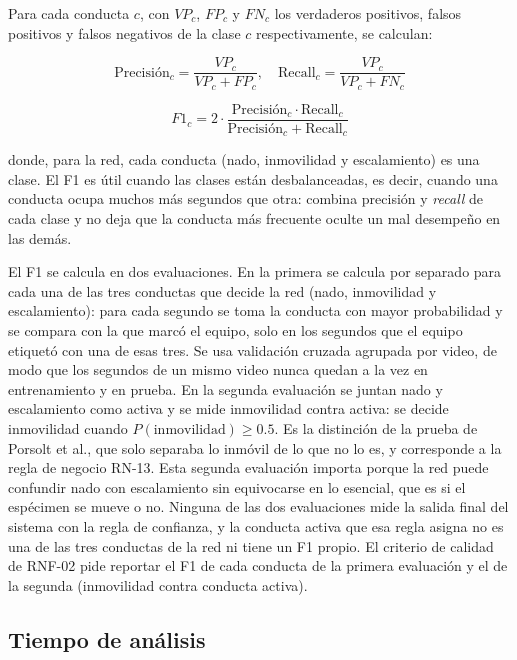 Para cada conducta $c$, con $VP_c$, $FP_c$ y $FN_c$ los verdaderos positivos, falsos
positivos y falsos negativos de la clase $c$ respectivamente, se calculan:

\begin{equation}
    \text{Precisión}_c = \frac{VP_c}{VP_c + FP_c}, \quad
    \text{Recall}_c = \frac{VP_c}{VP_c + FN_c}
    \label{eq:precision_recall}
\end{equation}

\begin{equation}
    F1_c = 2 \cdot \frac{\text{Precisión}_c \cdot \text{Recall}_c}{\text{Precisión}_c + \text{Recall}_c}
    \label{eq:f1}
\end{equation}

donde, para la red, cada conducta (nado, inmovilidad y escalamiento) es una clase. El F1 es útil cuando las clases están
desbalanceadas, es decir, cuando una conducta ocupa muchos más segundos que otra: combina
precisión y \textit{recall} de cada clase y no deja que la conducta más frecuente oculte un
mal desempeño en las demás.

El F1 se calcula en dos evaluaciones. En la primera se calcula por separado para cada una
de las tres conductas que decide la red (nado, inmovilidad y escalamiento): para cada
segundo se toma la conducta con mayor probabilidad y se compara con la que marcó el
equipo, solo en los segundos que el equipo etiquetó con una de esas tres. Se usa validación
cruzada agrupada por video, de modo que los segundos de un mismo video nunca quedan a la
vez en entrenamiento y en prueba. En la segunda evaluación se juntan nado y escalamiento
como activa y se mide inmovilidad contra activa: se decide inmovilidad cuando
$P(\text{inmovilidad}) \geq 0.5$. Es la distinción de la prueba de Porsolt et al., que solo
separaba lo inmóvil de lo que no lo es, y corresponde a la regla de negocio RN-13. Esta
segunda evaluación importa porque la red puede confundir nado con escalamiento sin
equivocarse en lo esencial, que es si el espécimen se mueve o no. Ninguna de las dos
evaluaciones mide la salida final del sistema con la regla de confianza, y la conducta
activa que esa regla asigna no es una de las tres conductas de la red ni tiene un F1 propio.
El criterio de calidad de RNF-02 pide reportar el F1 de cada conducta de la primera
evaluación y el de la segunda (inmovilidad contra conducta activa).

\subsection{Tiempo de análisis}

